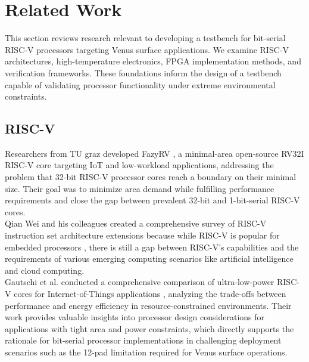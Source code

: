 \documentclass[10pt,twocolumn]{article}
\begin{document}
\section{Related Work}
This section reviews research relevant to developing a testbench for bit-serial RISC-V processors targeting Venus surface applications. We examine RISC-V architectures, high-temperature electronics, FPGA implementation methods, and verification frameworks. These foundations inform the design of a testbench capable of validating processor functionality under extreme environmental constraints.

\subsection{RISC-V}
Researchers from TU graz developed FazyRV \cite{kissich2024fazyrv}, a minimal-area open-source RV32I RISC-V core targeting IoT and low-workload applications, addressing the problem that 32-bit RISC-V processor cores reach a boundary on their minimal size. Their goal was to minimize area demand while fulfilling performance requirements and close the gap between prevalent 32-bit and 1-bit-serial RISC-V cores.\\
Qian Wei and his colleagues created a comprehensive survey of RISC-V instruction set architecture extensions because while RISC-V is popular for embedded processors \cite{cui2023riscv}, there is still a gap between RISC-V's capabilities and the requirements of various emerging computing scenarios like artificial intelligence and cloud computing.\\
Gautschi et al. conducted a comprehensive comparison of ultra-low-power RISC-V cores for Internet-of-Things applications \cite{gautschi2017slow}, analyzing the trade-offs between performance and energy efficiency in resource-constrained environments. Their work provides valuable insights into processor design considerations for applications with tight area and power constraints, which directly supports the rationale for bit-serial processor implementations in challenging deployment scenarios such as the 12-pad limitation required for Venus surface operations.
\end{document}
